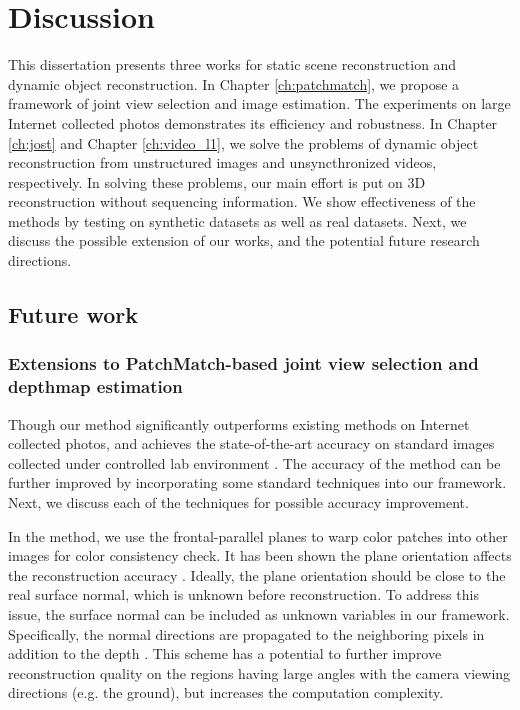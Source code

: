 \chapter{Discussion}
\label{ch:discussion}
This dissertation presents three works for static scene reconstruction and dynamic object reconstruction. In Chapter \ref{ch:patchmatch}, we propose a framework of joint view selection and image estimation. The experiments on large Internet collected photos demonstrates its efficiency and robustness. In Chapter \ref{ch:jost} and Chapter \ref{ch:video_l1}, we solve the problems of dynamic object reconstruction from unstructured images and unsyncthronized videos, respectively. In solving these problems, our main effort is put on 3D reconstruction without sequencing information. We show effectiveness of the methods by testing on synthetic datasets as well as real datasets. Next, we discuss the possible extension of our works, and the potential future research directions.


\section{Future work}


\subsection{Extensions to PatchMatch-based joint view selection and depthmap estimation}
\label{sec:patchmatch_extensions}

Though our method significantly outperforms existing methods on Internet collected photos, and
achieves the state-of-the-art accuracy on standard images collected under controlled lab environment \cite{Strecha08}. The accuracy of the method can be further improved by incorporating some standard techniques into our framework. Next, we discuss each of the techniques for possible accuracy improvement.

In the method, we use the frontal-parallel planes to warp color patches into other images for color consistency check. It has been shown the plane orientation affects the reconstruction accuracy \cite{Gallup07,FURUKAWA_PAMI2010}. 
Ideally, the plane orientation should be close to the real surface normal, which is unknown before reconstruction. To address this issue, the surface normal can be included as unknown variables in our framework. Specifically, the normal directions are propagated to the neighboring pixels in addition to the depth \cite{patchMatchStereo1}. This scheme has a potential to further improve reconstruction quality on the regions having large angles with the camera viewing directions (e.g. the ground), but increases the computation complexity.


